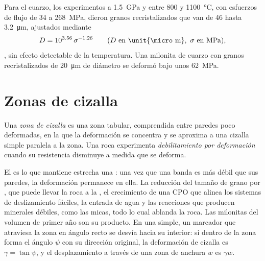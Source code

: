 Para el cuarzo, los experimentos a \qty{1.5}{GPa} y entre 800 y \qty{1100}{\celsius}, con
esfuerzos de flujo de 34 a \qty{268}{MPa}, dieron granos recristalizados que van de 46
hasta \qty{3.2}{\micro m}, ajustados mediante
\[
  D = 10^{3.56}\,\sigma^{-1.26}\qquad(D\text{ en \unit{\micro m}},\ \sigma\text{ en MPa}),
\],
sin efecto detectable de la temperatura. Una milonita de cuarzo con granos
recristalizados de \qty{20}{\micro m} de diámetro se deformó bajo unos
\qty{62}{MPa}.

\section{Zonas de cizalla}

\begin{definition}\label{def:b3:deformation-mechanisms:shear-zone}
Una \emph{zona de cizalla} es una zona tabular, comprendida entre paredes
poco deformadas, en la que la deformación se concentra y se aproxima a una
cizalla simple paralela a la zona. Una roca experimenta \emph{debilitamiento por
deformación} cuando su resistencia disminuye a medida que se deforma.
\end{definition}

El  es lo que mantiene estrecha una : una vez que una banda es más débil
que sus paredes, la deformación permanece en ella. La reducción del tamaño de grano por ,
que puede llevar la roca a la , el crecimiento de una
CPO que alinea los sistemas de deslizamiento fáciles, la entrada de agua y las reacciones que
producen minerales débiles, como las micas, todo lo cual ablanda la roca. Las milonitas del volumen de primer año
son su producto. En una  simple, un marcador que
atraviesa la zona en ángulo recto se desvía hacia su interior: si dentro de la zona forma
el ángulo $\psi$ con su dirección original, la deformación de cizalla es $\gamma
= \tan\psi$, y el desplazamiento a través de una zona de anchura $w$ es $\gamma w$.

